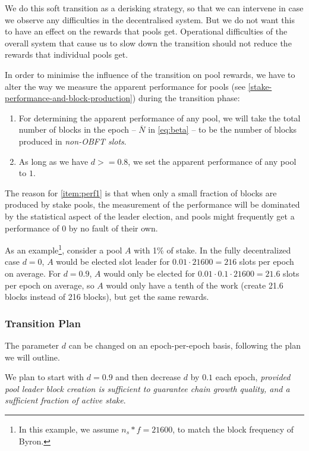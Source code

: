 \documentclass[11pt,a4paper,dvipsnames,twosided]{article}
\newcommand\Nbar{\overline{N}}
\begin{document}
We do this soft transition as a derisking strategy, so that we can intervene in
case we observe any difficulties in the decentralised system. But we do not want
this to have an effect on the rewards that pools get. Operational difficulties
of the overall system that cause us to slow down the transition should not
reduce the rewards that individual pools get.

In order to minimise the influence of the transition on pool rewards, we have to
alter the way we measure the apparent performance for pools (see
\cref{stake-performance-and-block-production}) during the transition phase:
\begin{enumerate}
  \item
    For determining the apparent performance of any pool, we will take the total
    number of blocks in the epoch -- \(\Nbar\) in \cref{eq:beta} -- to be the
    number of blocks produced in \emph{non-OBFT slots}.
  \item
    As long as we have \(d >= 0.8\), we set the apparent performance of any pool
    to \(1\).
    \label{item:perf1}
\end{enumerate}
The reason for \cref{item:perf1} is that when only a small fraction of blocks
are produced by stake pools, the measurement of the performance will be
dominated by the statistical aspect of the leader election, and pools might
frequently get a performance of \(0\) by no fault of their own.

As an example\footnote{In this example, we assume \(n_s*f=21600\), to match the
  block frequency of Byron.}, consider a pool \(A\) with 1\% of stake. In the
fully decentralized case \(d=0\), \(A\) would be elected slot leader for
\(0.01\cdot 21600=216\) slots per epoch on average. For \(d=0.9\), \(A\) would
only be elected for \(0.01\cdot 0.1\cdot 21600=21.6\) slots per epoch on
average, so \(A\) would only have a tenth of the work (create 21.6 blocks
instead of 216 blocks), but get the same rewards.

\subsubsection{Transition Plan}
\label{transition-plan}

The parameter \(d\) can be changed on an epoch-per-epoch basis, following
the plan we will outline.

We plan to start with \(d=0.9\) and then decrease \(d\) by \(0.1\) each
epoch, \emph{provided pool leader block creation is sufficient to
guarantee chain growth quality, and a sufficient fraction of active
stake}.
\end{document}
